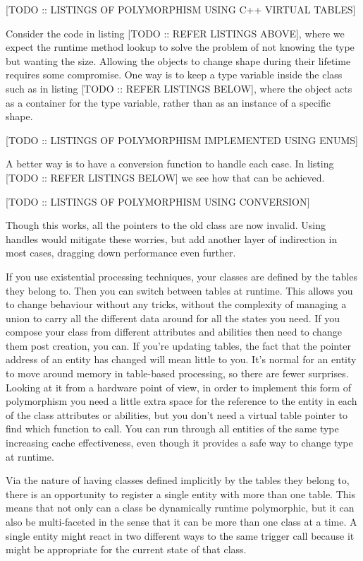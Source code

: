 \documentclass[a4paper,12pt]{article}
\begin{document}
[TODO :: LISTINGS OF POLYMORPHISM USING C++ VIRTUAL TABLES]

Consider the code in listing [TODO :: REFER LISTINGS ABOVE], where we expect the runtime method lookup to solve the problem of not knowing the type but wanting the size.
Allowing the objects to change shape during their lifetime requires some compromise.
One way is to keep a type variable inside the class such as in listing [TODO :: REFER LISTINGS BELOW], where the object acts as a container for the type variable, rather than as an instance of a specific shape.

[TODO :: LISTINGS OF POLYMORPHISM IMPLEMENTED USING ENUMS]

A better way is to have a conversion function to handle each case.
In listing [TODO :: REFER LISTINGS BELOW] we see how that can be achieved.

[TODO :: LISTINGS OF POLYMORPHISM USING CONVERSION]

Though this works, all the pointers to the old class are now invalid.
Using handles would mitigate these worries, but add another layer of indirection in most cases, dragging down performance even further.

If you use existential processing techniques, your classes are defined by the tables they belong to.
Then you can switch between tables at runtime.
This allows you to change behaviour without any tricks, without the complexity of managing a union to carry all the different data around for all the states you need.
If you compose your class from different attributes and abilities then need to change them post creation, you can.
If you're updating tables, the fact that the pointer address of an entity has changed will mean little to you.
It's normal for an entity to move around memory in table-based processing, so there are fewer surprises.
Looking at it from a hardware point of view, in order to implement this form of polymorphism you need a little extra space for the reference to the entity in each of the class attributes or abilities, but you don't need a virtual table pointer to find which function to call.
You can run through all entities of the same type increasing cache effectiveness, even though it provides a safe way to change type at runtime.

Via the nature of having classes defined implicitly by the tables they belong to, there is an opportunity to register a single entity with more than one table.
This means that not only can a class be dynamically runtime polymorphic, but it can also be multi-faceted in the sense that it can be more than one class at a time.
A single entity might react in two different ways to the same trigger call because it might be appropriate for the current state of that class.
\end{document}
